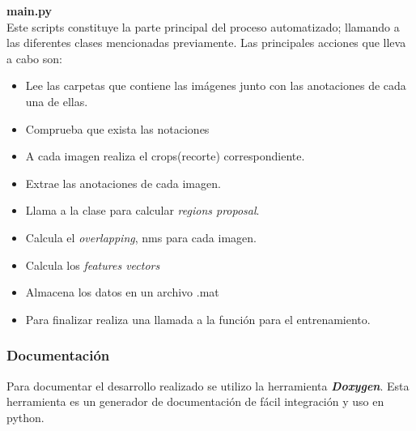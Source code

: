 \textbf{main.py}\\
Este scripts constituye la parte principal del proceso automatizado; llamando a las diferentes clases mencionadas previamente. Las principales 
acciones que lleva a cabo son:
\begin{itemize}
 \item Lee las carpetas que contiene las imágenes junto con las anotaciones de cada una de ellas.
 \item Comprueba que exista las notaciones
 \item A cada imagen realiza el crops(recorte) correspondiente.
 \item Extrae las anotaciones de cada imagen.
 \item Llama a la clase para calcular \textit{regions proposal}.
 \item Calcula el \textit{overlapping}, \ac{nms} para cada imagen.
 \item Calcula los \textit{features vectors}
 \item Almacena los datos en un archivo .mat
 \item Para finalizar realiza una llamada a la función para el entrenamiento.
\end{itemize}

\subsubsection*{Documentación}\label{sub:documentacion}
Para documentar el desarrollo realizado se utilizo la herramienta \textbf{\textit{Doxygen}}. Esta herramienta es un generador de documentación de fácil integración y uso en python.